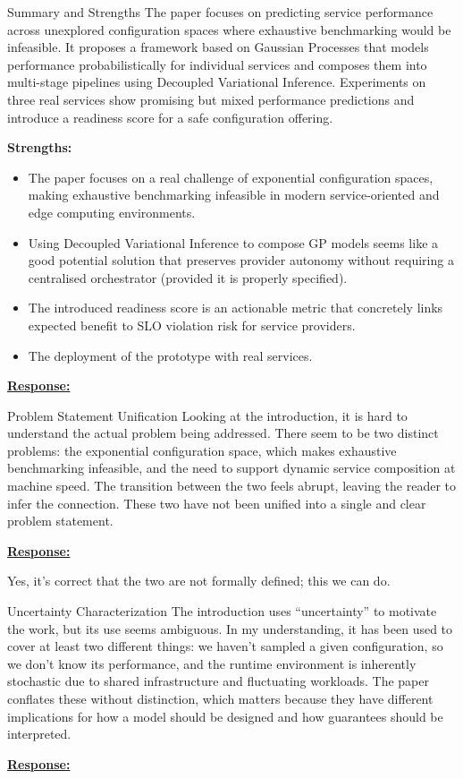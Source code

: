 \documentclass{article}
\newcommand{\Response}[1][]{%
    \noindent\underline{\textbf{Response:}}\par\vspace{0.2cm}%
    #1\par\vspace{0.6cm}%
}
\begin{document}
\begin{cmt*}{Summary and Strengths}{}
The paper focuses on predicting service performance across unexplored configuration spaces where exhaustive benchmarking would be infeasible. It proposes a framework based on Gaussian Processes that models performance probabilistically for individual services and composes them into multi-stage pipelines using Decoupled Variational Inference. Experiments on three real services show promising but mixed performance predictions and introduce a readiness score for a safe configuration offering.

\textbf{Strengths:}
\begin{itemize}[noitemsep,topsep=0pt]
    \item The paper focuses on a real challenge of exponential configuration spaces, making exhaustive benchmarking infeasible in modern service-oriented and edge computing environments.
    \item Using Decoupled Variational Inference to compose GP models seems like a good potential solution that preserves provider autonomy without requiring a centralised orchestrator (provided it is properly specified).
    \item The introduced readiness score is an actionable metric that concretely links expected benefit to SLO violation risk for service providers.
    \item The deployment of the prototype with real services.
\end{itemize}
\end{cmt*}

\Response

\begin{cmt}{Problem Statement Unification}{}
Looking at the introduction, it is hard to understand the actual problem being addressed. There seem to be two distinct problems: the exponential configuration space, which makes exhaustive benchmarking infeasible, and the need to support dynamic service composition at machine speed. The transition between the two feels abrupt, leaving the reader to infer the connection. These two have not been unified into a single and clear problem statement.
\end{cmt}
\Response

Yes, it's correct that the two are not formally defined; this we can do.

\begin{cmt}{Uncertainty Characterization}{}
The introduction uses ``uncertainty'' to motivate the work, but its use seems ambiguous. In my understanding, it has been used to cover at least two different things: we haven't sampled a given configuration, so we don't know its performance, and the runtime environment is inherently stochastic due to shared infrastructure and fluctuating workloads. The paper conflates these without distinction, which matters because they have different implications for how a model should be designed and how guarantees should be interpreted.
\end{cmt}
\Response
\end{document}
